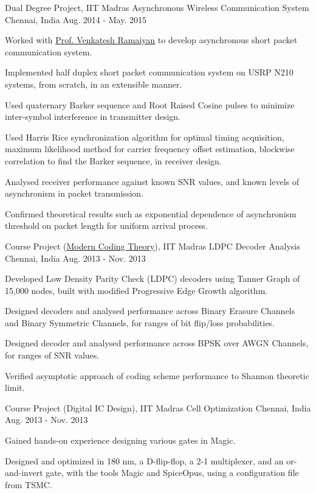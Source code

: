 \begin{cventries}
	\cventry
	{Dual Degree Project, IIT Madras}
	{Asynchronous Wireless Communication System}
	{Chennai, India}
	{Aug. 2014 - May. 2015}
	{
		\begin{cvitems}
		\item{Worked with \href{http://www.ee.iitm.ac.in/~rvenkat/}{Prof. Venkatesh Ramaiyan} to develop asynchronous short packet communication system.}
		\item{Implemented half duplex short packet communication system on USRP N210 systems, from scratch, in an extensible manner.}
		\item{Used quaternary Barker sequence and Root Raised Cosine pulses to minimize inter-symbol interference in transmitter design.}
		\item{Used Harris Rice synchronization algorithm for optimal timing acquisition, maximum likelihood method for carrier frequency offset estimation, blockwise correlation to find the Barker sequence, in receiver design.}
		\item{Analysed receiver performance against known SNR values, and known levels of asynchronism in packet transmission.}
		\item{Confirmed theoretical results such as exponential dependence of asynchronism threshold on packet length for uniform arrival process.}
		\end{cvitems}
	}

	\cventry
	{Course Project (\href{http://www.ee.iitm.ac.in/2015/03/modern-coding-theory-ee5161/}{Modern Coding Theory}), IIT Madras}
	{LDPC Decoder Analysis}
	{Chennai, India}
	{Aug. 2013 - Nov. 2013}
	{
		\begin{cvitems}
		\item{Developed Low Density Parity Check (LDPC) decoders using Tanner Graph of 15,000 nodes, built with modified Progressive Edge Growth algorithm.}
		\item{Designed decoders and analysed performance across Binary Erasure Channels and Binary Symmetric Channels, for ranges of bit flip/loss probabilities.}
		\item{Designed decoder and analysed performance across BPSK over AWGN Channels, for ranges of SNR values.}
		\item{Verified asymptotic approach of coding scheme performance to Shannon theoretic limit.}
		\end{cvitems}
	}

	\cventry
	{Course Project (Digital IC Design), IIT Madras}
	{Cell Optimization}
	{Chennai, India}
	{Aug. 2013 - Nov. 2013}
	{
		\begin{cvitems}
		\item{Gained hands-on experience designing various gates in Magic.}
		\item{Designed and optimized in 180 nm, a D-flip-flop, a 2-1 multiplexer, and an or-and-invert gate, with the tools Magic and SpiceOpus, using a configuration file from TSMC.}
		\end{cvitems}
	}

\end{cventries}
